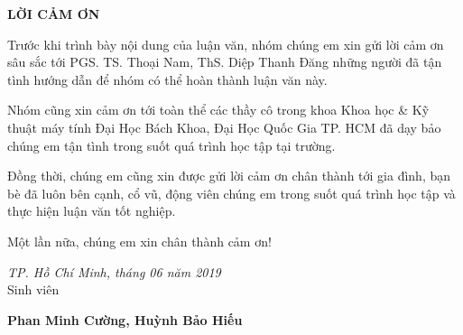 \centerline{\bf \large\MakeUppercase{Lời cảm ơn}}

\vspace{20pt}

Trước khi trình bày nội dung của luận văn, nhóm chúng em xin gửi lời cảm ơn sâu sắc tới PGS. TS. Thoại Nam, ThS. Diệp Thanh Đăng những người đã tận tình hướng dẫn để nhóm có thể hoàn thành luận văn này.

Nhóm cũng xin cảm ơn tới toàn thể các thầy cô trong khoa Khoa học \& Kỹ thuật máy tính Đại Học Bách Khoa, Đại Học Quốc Gia TP. HCM đã dạy bảo chúng em tận tình trong suốt quá trình học tập tại trường.

Đồng thời, chúng em cũng xin được gửi lời cảm ơn chân thành tới gia đình, bạn bè đã luôn bên cạnh, cổ vũ, động viên chúng em trong suốt quá trình học tập và thực hiện luận văn tốt nghiệp. 

Một lần nữa, chúng em xin chân thành cảm ơn! 

\begin{flushright}
	{\it TP. Hồ Chí Minh, tháng 06 năm 2019}\\

	Sinh viên \hskip 2.5cm\quad
	
	\vskip 1cm
	{\bf Phan Minh Cường, Huỳnh Bảo Hiếu} \quad\ 
\end{flushright}